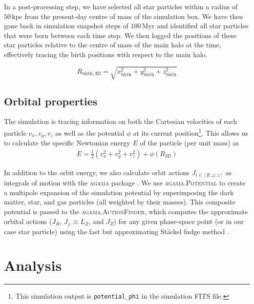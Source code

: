 \documentclass[fleqn,usenatbib]{mnras}
\begin{document}
In a post-processing step, we have selected all star particles within a radius of $50\,\mathrm{kpc}$ from the present-day centre of mass of the simulation box. We have then gone back in simulation snapshot steps of $100\,\mathrm{Myr}$ and identified all star particles that were born between each time step. We then logged the positions of these star particles relative to the centre of mass of the main halo at the time, effectively tracing the birth positions with respect to the main halo.

\begin{equation}
    R_{\mathrm{birth}, \mathrm{3D}} = \sqrt{x_{\mathrm{birth}}^2 + y_{\mathrm{birth}}^2 + z_{\mathrm{birth}}^2}
\end{equation}

\subsection{Orbital properties}  \label{sec:data_orbit_properties}

The simulation is tracing information on both the Cartesian velocities of each particle $v_x, v_y, v_z$ as well as the potential $\phi$ at its current position\footnote{This simulation output is \texttt{potential\_phi} in the simulation FITS file.}. This allows us to calculate the specific Newtonian energy $E$ of the particle (per unit mass) as
\begin{align}
    E = \frac{1}{2}\left( v_x^2 + v_y^2 + v_z^2 \right) + \phi(R_\mathrm{3D})
\end{align}

In addition to the orbit energy, we also calculate orbit actions $J_{i \in [R, \varphi,z]}$ as integrals of motion with the \textsc{agama} package \citep{Vasiliev2019b}. We use \textsc{agama.Potential} to create a multipole expansion of the simulation potential by superimposing the dark matter, star, and gas particles (all weighted by their masses). This composite potential is passed to the \textsc{agama.ActionFinder}, which computes the approximate orbital actions ($J_R$, $J_\varphi \equiv L_Z$, and $J_Z$) for any given phase-space point (or in our case star particle) using the fast but approximating Stäckel fudge method \citep{Binney2012, Sanders2015b}.

\section{Analysis} \label{sec:analysis}
\end{document}
